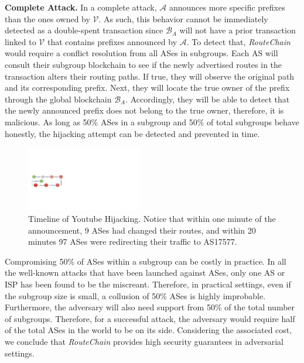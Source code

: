 \documentclass[5p]{elsarticle}
\newcommand{\BfPara}[1]{{\noindent\bf#1.}\xspace}
\newcommand{\rc}{{{\em RouteChain}}\xspace}
\begin{document}
\BfPara{Complete Attack} In a complete attack, $\mathcal{A}$ announces more specific prefixes than the ones owned by $\mathcal{V}$. As such, this behavior cannot be immediately detected as a double-spent transaction since $\mathcal{B}_{A}$ will not have a prior transaction linked to $\mathcal{V}$ that contains prefixes announced by $\mathcal{A}$. To detect that, \rc would require a conflict resolution from all ASes in subgroups. Each AS will consult their subgroup blockchain to see if the newly advertised routes in the transaction alters their routing paths. If true, they will observe the original path and its corresponding prefix. Next, they will locate the true owner of the prefix through the global blockchain $\mathcal{B}_{A}$. Accordingly, they will be able to detect that the newly announced prefix does not belong to the true owner, therefore, it is malicious. As long as 50\% ASes in a subgroup and 50\% of total subgroups behave honestly, the hijacking attempt can be detected and prevented in time. 

\begin{figure}[t]
\begin{center}
\includegraphics[width=0.45\textwidth]{fig/123.pdf}
\caption{Timeline of Youtube Hijacking. Notice that within one minute of the announcement, 9 ASes had changed their routes, and within 20 minutes 97 ASes were redirecting their traffic to AS17577.} 
\label{fig:YThijack}
\end{center}
\end{figure}

Compromising 50\% of ASes within a subgroup can be costly in practice. In all the well-known attacks that have been launched against ASes, only one AS or ISP has been found to be the miscreant. Therefore, in practical settings, even if the subgroup size is small, a collusion of 50\% ASes is highly improbable. Furthermore, the adversary will also need support from 50\% of the total number of subgroups. Therefore, for a successful attack, the adversary would require half of the total ASes in the world to be on its side. Considering the associated cost, we conclude that \rc provides high security guarantees in adversarial settings.  
\end{document}
